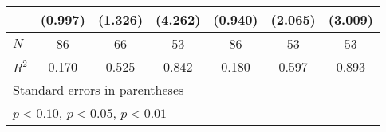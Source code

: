 {\begin{tabular}{l*{6}{c}}
            &     (0.997)         &     (1.326)         &     (4.262)         &     (0.940)         &     (2.065)         &     (3.009)         \\
\hline
\(N\)       &          86         &          66         &          53         &          86         &          53         &          53         \\
\(R^{2}\)   &       0.170         &       0.525         &       0.842         &       0.180         &       0.597         &       0.893         \\
\hline\hline
\multicolumn{7}{l}{\footnotesize Standard errors in parentheses}\\
\multicolumn{7}{l}{\footnotesize \sym{*} \(p<0.10\), \sym{**} \(p<0.05\), \sym{***} \(p<0.01\)}\\
\end{tabular}
}
